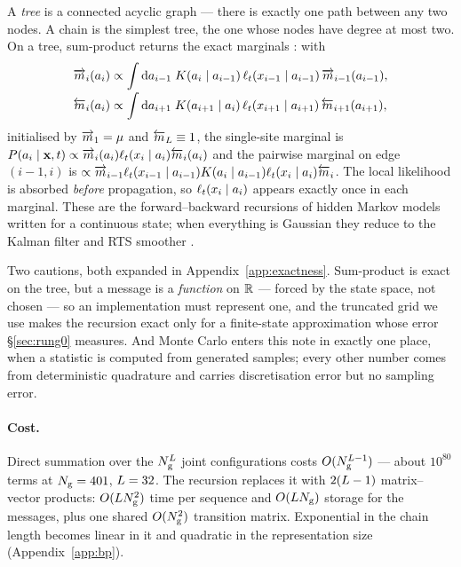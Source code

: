\documentclass{article}
\begin{document}
A \emph{tree} is a connected acyclic graph --- there is exactly one path between any two nodes. A
chain is the simplest tree, the one whose nodes have degree at most two. On a tree, sum-product
returns the exact marginals \citep{pearl1988,kschischang2001,mezard2009}: with
\begin{align}
\label{eq:messages}
\overrightarrow{m}_{i}(a_i) &\propto \int \mathrm{d}a_{i-1}\;
K(a_i\mid a_{i-1})\,\ell_t(x_{i-1}\mid a_{i-1})\,\overrightarrow{m}_{i-1}(a_{i-1}), \nonumber\\[-2pt]
\overleftarrow{m}_{i}(a_i) &\propto \int \mathrm{d}a_{i+1}\;
K(a_{i+1}\mid a_i)\,\ell_t(x_{i+1}\mid a_{i+1})\,\overleftarrow{m}_{i+1}(a_{i+1}),
\end{align}
initialised by $\overrightarrow{m}_1 = \mu$ and $\overleftarrow{m}_{L}\equiv 1$, the single-site marginal is
$P(a_i\mid \mathbf{x},t) \propto \overrightarrow{m}_i(a_i)\ell_t(x_i\mid a_i)\overleftarrow{m}_i(a_i)$ and the pairwise marginal on
edge $(i-1,i)$ is $\propto \overrightarrow{m}_{i-1}\ell_t(x_{i-1}\mid a_{i-1})K(a_i\mid
a_{i-1})\ell_t(x_i\mid a_i)\overleftarrow{m}_i$. The local likelihood is absorbed \emph{before} propagation, so
$\ell_t(x_i\mid a_i)$ appears exactly once in each marginal. These are the forward--backward
recursions of hidden Markov models \citep{baum1970,rabiner1989} written for a continuous state;
when everything is Gaussian they reduce to the Kalman filter and RTS smoother
\citep{kalman1960,rauch1965}.


Two cautions, both expanded in Appendix~\ref{app:exactness}. Sum-product is exact on the tree,
but a message is a \emph{function} on $\mathbb{R}$ --- forced by the state space, not chosen --- so an
implementation must represent one, and the truncated grid we use makes the recursion exact only
for a finite-state approximation whose error \S\ref{sec:rung0} measures. And Monte Carlo enters
this note in exactly one place, when a statistic is computed from generated samples; every other
number comes from deterministic quadrature and carries discretisation error but no sampling error.

\paragraph{Cost.} Direct summation over the $N_{\mathrm{g}}^{L}$ joint configurations costs
$O(N_{\mathrm{g}}^{L-1})$ --- about $10^{80}$ terms at $N_{\mathrm{g}}=401$, $L=32$. The recursion
replaces it with $2(L-1)$ matrix--vector products: $O(LN_{\mathrm{g}}^{2})$ time per sequence
and $O(LN_{\mathrm{g}})$ storage for the messages, plus one shared $O(N_{\mathrm{g}}^{2})$ transition
matrix. Exponential in the chain length becomes linear in it and quadratic in the representation
size (Appendix~\ref{app:bp}).
\end{document}
